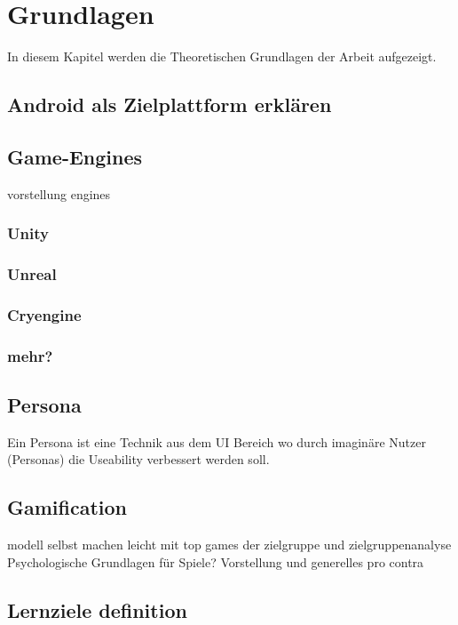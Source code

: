 \section{Grundlagen}
	In diesem Kapitel werden die Theoretischen Grundlagen der Arbeit aufgezeigt.
\subsection{Android als Zielplattform erklären}
\subsection{Game-Engines}
	vorstellung engines
	\subsubsection{Unity}
	\subsubsection{Unreal}
	\subsubsection{Cryengine}
	\subsubsection{mehr?}
\subsection{Persona}\label{ssec:persona}
	Ein Persona ist eine Technik aus dem UI Bereich wo durch imaginäre Nutzer (Personas) die Useability verbessert werden soll.
\subsection{Gamification}
	modell selbst machen leicht mit top games der zielgruppe und zielgruppenanalyse
	Psychologische Grundlagen für Spiele?
	Vorstellung und generelles pro contra
\subsection{Lernziele definition}

